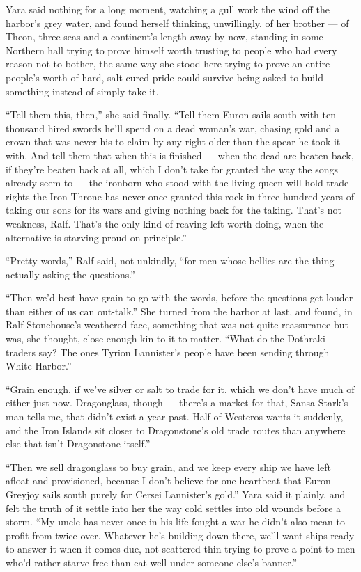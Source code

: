 Yara said nothing for a long moment, watching a gull work the wind off the harbor’s grey water, and found herself thinking, unwillingly, of her brother — of Theon, three seas and a continent’s length away by now, standing in some Northern hall trying to prove himself worth trusting to people who had every reason not to bother, the same way she stood here trying to prove an entire people’s worth of hard, salt-cured pride could survive being asked to build something instead of simply take it.

“Tell them this, then,” she said finally. “Tell them Euron sails south with ten thousand hired swords he’ll spend on a dead woman’s war, chasing gold and a crown that was never his to claim by any right older than the spear he took it with. And tell them that when this is finished — when the dead are beaten back, if they’re beaten back at all, which I don’t take for granted the way the songs already seem to — the ironborn who stood with the living queen will hold trade rights the Iron Throne has never once granted this rock in three hundred years of taking our sons for its wars and giving nothing back for the taking. That’s not weakness, Ralf. That’s the only kind of reaving left worth doing, when the alternative is starving proud on principle.”

“Pretty words,” Ralf said, not unkindly, “for men whose bellies are the thing actually asking the questions.”

“Then we’d best have grain to go with the words, before the questions get louder than either of us can out-talk.” She turned from the harbor at last, and found, in Ralf Stonehouse’s weathered face, something that was not quite reassurance but was, she thought, close enough kin to it to matter. “What do the Dothraki traders say? The ones Tyrion Lannister’s people have been sending through White Harbor.”

“Grain enough, if we’ve silver or salt to trade for it, which we don’t have much of either just now. Dragonglass, though — there’s a market for that, Sansa Stark’s man tells me, that didn’t exist a year past. Half of Westeros wants it suddenly, and the Iron Islands sit closer to Dragonstone’s old trade routes than anywhere else that isn’t Dragonstone itself.”

“Then we sell dragonglass to buy grain, and we keep every ship we have left afloat and provisioned, because I don’t believe for one heartbeat that Euron Greyjoy sails south purely for Cersei Lannister’s gold.” Yara said it plainly, and felt the truth of it settle into her the way cold settles into old wounds before a storm. “My uncle has never once in his life fought a war he didn’t also mean to profit from twice over. Whatever he’s building down there, we’ll want ships ready to answer it when it comes due, not scattered thin trying to prove a point to men who’d rather starve free than eat well under someone else’s banner.”

